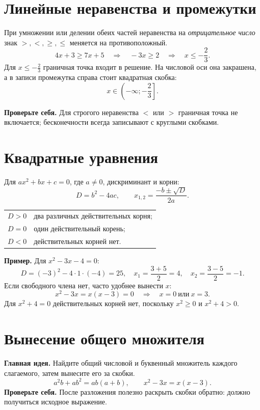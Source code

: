 \documentclass[a4paper,12pt]{article}
\newcommand{\idea}[1]{\textcolor{darkaccent}{\textbf{Главная идея.}} #1}
\newcommand{\attention}[1]{\textcolor{darkaccent}{\textbf{Проверьте себя.}} #1}
\newcommand{\ex}[1]{\textcolor{darkaccent}{\textbf{Пример.}} #1}
\begin{document}
\section{Линейные неравенства и промежутки}
При умножении или делении обеих частей неравенства на \emph{отрицательное число} знак \(>,<,\ge,\le\) меняется на противоположный.
\[
4x+3\ge7x+5\quad\Longrightarrow\quad -3x\ge2
\quad\Longrightarrow\quad \boxed{x\le-\frac23}.
\]
Для \(x\le-\frac23\) граничная точка входит в решение. На числовой оси она закрашена, а в записи промежутка справа стоит квадратная скобка:
\[
x\in\left(-\infty;-\frac23\right].
\]
\begin{center}
\end{center}
\attention{Для строгого неравенства \(<\) или \(>\) граничная точка не включается; бесконечности всегда записывают с круглыми скобками.}

\section{Квадратные уравнения}
Для \(ax^2+bx+c=0\), где \(a\ne0\), дискриминант и корни:
\[
D=b^2-4ac,\qquad x_{1,2}=\frac{-b\pm\sqrt D}{2a}.
\]
\begin{center}
\begin{tabular}{@{}ll@{}}
\toprule
\(D>0\) & два различных действительных корня;\\
\(D=0\) & один действительный корень;\\
\(D<0\) & действительных корней нет.\\
\bottomrule
\end{tabular}
\end{center}
\ex{Для \(x^2-3x-4=0\):}
\[
D=(-3)^2-4\cdot1\cdot(-4)=25,
\quad x_1=\frac{3+5}{2}=4,
\quad x_2=\frac{3-5}{2}=-1.
\]
Если свободного члена нет, часто удобнее вынести \(x\):
\[
x^2-3x=x(x-3)=0\quad\Longrightarrow\quad x=0\ \text{или}\ x=3.
\]
Для \(x^2+4=0\) действительных корней нет, поскольку \(x^2\ge0\) и \(x^2+4>0\).

\section{Вынесение общего множителя}
\idea{Найдите общий числовой и буквенный множитель каждого слагаемого, затем вынесите его за скобки.}
\[
a^2b+ab^2=ab(a+b),\qquad
x^2-3x=x(x-3).
\]
\attention{После разложения полезно раскрыть скобки обратно: должно получиться исходное выражение.}
\end{document}
